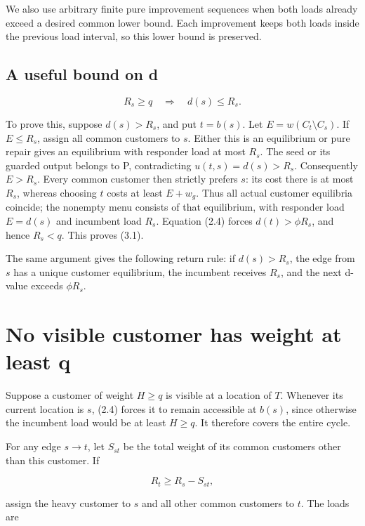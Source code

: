 \documentclass[11pt,a4paper]{article}
\begin{document}
We also use arbitrary finite pure improvement sequences when both loads already exceed a desired common lower bound. Each improvement keeps both loads inside the previous load interval, so this lower bound is preserved.

\hypertarget{a-useful-bound-on-d}{%
\subsection{A useful bound on d}\label{a-useful-bound-on-d}}

\[
R_s\ge q\quad\Longrightarrow\quad d(s)\le R_s. \tag{3.1}
\]

To prove this, suppose \(d(s)>R_s\), and put \(t=b(s)\). Let \(E=w(C_t\setminus C_s)\). If \(E\le R_s\), assign all common customers to \(s\). Either this is an equilibrium or pure repair gives an equilibrium with responder load at most \(R_s\). The seed or its guarded output belongs to P, contradicting \(u(t,s)=d(s)>R_s\). Consequently \(E>R_s\). Every common customer then strictly prefers \(s\): its cost there is at most \(R_s\), whereas choosing \(t\) costs at least \(E+w_g\). Thus all actual customer equilibria coincide; the nonempty menu consists of that equilibrium, with responder load \(E=d(s)\) and incumbent load \(R_s\). Equation (2.4) forces \(d(t)>\phi R_s\), and hence \(R_s<q\). This proves (3.1).

The same argument gives the following return rule: if \(d(s)>R_s\), the edge from \(s\) has a unique customer equilibrium, the incumbent receives \(R_s\), and the next d-value exceeds \(\phi R_s\).

\hypertarget{no-visible-customer-has-weight-at-least-q}{%
\section{No visible customer has weight at least q}\label{no-visible-customer-has-weight-at-least-q}}

Suppose a customer of weight \(H\ge q\) is visible at a location of \(T\). Whenever its current location is \(s\), (2.4) forces it to remain accessible at \(b(s)\), since otherwise the incumbent load would be at least \(H\ge q\). It therefore covers the entire cycle.

For any edge \(s\to t\), let \(S_{st}\) be the total weight of its common customers other than this customer. If

\[
R_t\ge R_s-S_{st},
\]

assign the heavy customer to \(s\) and all other common customers to \(t\). The loads are
\end{document}
